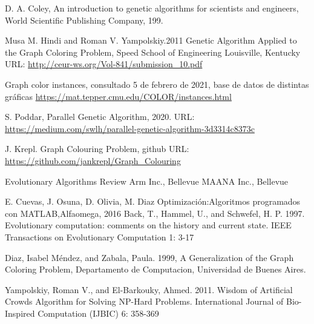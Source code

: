 \documentclass{article}
\begin{document}
\begin{thebibliography}{0}


  D. A. Coley, An introduction to genetic algorithms for scientists and engineers, World Scientific Publishing Company, 199.
        
  
      Musa M. Hindi and Roman V. Yampolskiy.2011 Genetic Algorithm Applied to the Graph Coloring Problem, Speed School of Engineering
    Louisville, Kentucky URL: \url{http://ceur-ws.org/Vol-841/submission_10.pdf}
    
    Graph color instances, consultado 5 de febrero de 2021, base de datos de distintas gráficas \url{https://mat.tepper.cmu.edu/COLOR/instances.html}
    
     S. Poddar, Parallel Genetic Algorithm, 2020. URL:       \url{https://medium.com/swlh/parallel-genetic-algorithm-3d3314c8373c}
    
    J. Krepl. Graph Colouring Problem, github
    URL: \url{https://github.com/jankrepl/Graph_Colouring}
    
    
    Evolutionary Algorithms Review
    Arm Inc., Bellevue
    MAANA Inc., Bellevue

    E. Cuevas, J. Osuna, D. Olivia, M. Diaz
    Optimización:Algoritmos programados con MATLAB,Alfaomega, 2016
    Back, T., Hammel, U., and Schwefel, H. P. 1997. Evolutionary
    computation: comments on the history and current state. IEEE
    Transactions on Evolutionary Computation 1: 3-17
    
    Diaz, Isabel Méndez, and Zabala, Paula. 1999, A Generalization
    of the Graph Coloring Problem, Departamento de Computacion,
    Universidad de Buenes Aires.
    

    
    Yampolskiy, Roman V., and El-Barkouky, Ahmed. 2011.
    Wisdom of Artificial Crowds Algorithm for Solving NP-Hard
    Problems. International Journal of Bio-Inspired Computation
    (IJBIC) 6: 358-369
    

\end{thebibliography}
\end{document}
